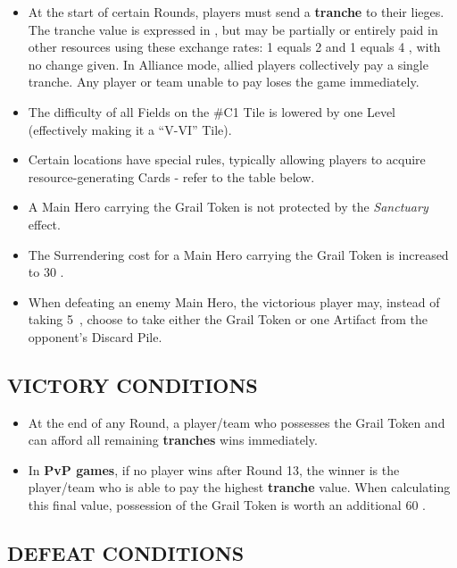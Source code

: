\begin{multicols}{2}
\begin{itemize}
  \item At the start of certain Rounds, players must send a \textbf{tranche} to their lieges. The tranche value is expressed in , but may be partially or entirely paid in other resources using these exchange rates: 1  equals 2  and 1  equals 4 , with no change given. In Alliance mode, allied players collectively pay a single tranche. Any player or team unable to pay loses the game immediately.  
  \item The difficulty of all Fields on the \#C1 Tile is lowered by one Level (effectively making it a ``V-VI'' Tile).  
  \item Certain locations have special rules, typically allowing players to acquire resource-generating Cards - refer to the table below.
  \item A Main Hero carrying the Grail Token is not protected by the \textit{Sanctuary} effect.
  \item The Surrendering cost for a Main Hero carrying the Grail Token is increased to 30 .
  \item When defeating an enemy Main Hero, the victorious player may, instead of taking \mbox{5 }, choose to take either the Grail Token or one Artifact from the opponent's Discard Pile.
\end{itemize}

\subsection*{\MakeUppercase{Victory Conditions}}  

\begin{itemize}  
  \item At the end of any Round, a player/team who possesses the Grail Token and can afford all remaining \textbf{tranches} wins immediately.  
  \item In \textbf{PvP games}, if no player wins after Round 13, the winner is the player/team who is able to pay the highest \textbf{tranche} value. When calculating this final value, possession of the Grail Token is worth an additional 60 .  
\end{itemize}  

\subsection*{\MakeUppercase{Defeat Conditions}}  


\end{multicols}
